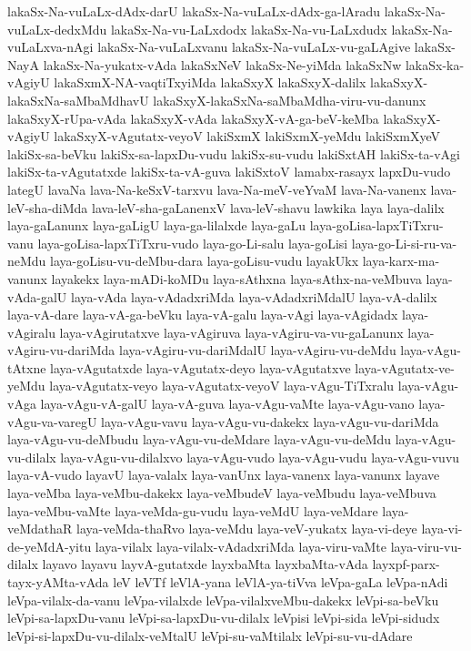 {lakaSx-Na-vuLaLx-dAdx-darU
lakaSx-Na-vuLaLx-dAdx-ga-lAradu
lakaSx-Na-vuLaLx-dedxMdu
lakaSx-Na-vu-LaLxdodx
lakaSx-Na-vu-LaLxdudx
lakaSx-Na-vuLaLxva-nAgi
lakaSx-Na-vuLaLxvanu
lakaSx-Na-vuLaLx-vu-gaLAgive
lakaSx-NayA
lakaSx-Na-yukatx-vAda
lakaSxNeV
lakaSx-Ne-yiMda
lakaSxNw
lakaSx-ka-vAgiyU
lakaSxmX-NA-vaqtiTxyiMda
lakaSxyX
lakaSxyX-dalilx
lakaSxyX-lakaSxNa-saMbaMdhavU
lakaSxyX-lakaSxNa-saMbaMdha-viru-vu-danunx
lakaSxyX-rUpa-vAda
lakaSxyX-vAda
lakaSxyX-vA-ga-beV-keMba
lakaSxyX-vAgiyU
lakaSxyX-vAgutatx-veyoV
lakiSxmX
lakiSxmX-yeMdu
lakiSxmXyeV
lakiSx-sa-beVku
lakiSx-sa-lapxDu-vudu
lakiSx-su-vudu
lakiSxtAH
lakiSx-ta-vAgi
lakiSx-ta-vAgutatxde
lakiSx-ta-vA-guva
lakiSxtoV
lamabx-rasayx
lapxDu-vudo
lategU
lavaNa
lava-Na-keSxV-tarxvu
lava-Na-meV-veYvaM
lava-Na-vanenx
lava-leV-sha-diMda
lava-leV-sha-gaLanenxV
lava-leV-shavu
lawkika
laya
laya-dalilx
laya-gaLanunx
laya-gaLigU
laya-ga-lilalxde
laya-gaLu
laya-goLisa-lapxTiTxru-vanu
laya-goLisa-lapxTiTxru-vudo
laya-go-Li-salu
laya-goLisi
laya-go-Li-si-ru-va-neMdu
laya-goLisu-vu-deMbu-dara
laya-goLisu-vudu
layakUkx
laya-karx-ma-vanunx
layakekx
laya-mADi-koMDu
laya-sAthxna
laya-sAthx-na-veMbuva
laya-vAda-galU
laya-vAda
laya-vAdadxriMda
laya-vAdadxriMdalU
laya-vA-dalilx
laya-vA-dare
laya-vA-ga-beVku
laya-vA-galu
laya-vAgi
laya-vAgidadx
laya-vAgiralu
laya-vAgirutatxve
laya-vAgiruva
laya-vAgiru-va-vu-gaLanunx
laya-vAgiru-vu-dariMda
laya-vAgiru-vu-dariMdalU
laya-vAgiru-vu-deMdu
laya-vAgu-tAtxne
laya-vAgutatxde
laya-vAgutatx-deyo
laya-vAgutatxve
laya-vAgutatx-ve-yeMdu
laya-vAgutatx-veyo
laya-vAgutatx-veyoV
laya-vAgu-TiTxralu
laya-vAgu-vAga
laya-vAgu-vA-galU
laya-vA-guva
laya-vAgu-vaMte
laya-vAgu-vano
laya-vAgu-va-varegU
laya-vAgu-vavu
laya-vAgu-vu-dakekx
laya-vAgu-vu-dariMda
laya-vAgu-vu-deMbudu
laya-vAgu-vu-deMdare
laya-vAgu-vu-deMdu
laya-vAgu-vu-dilalx
laya-vAgu-vu-dilalxvo
laya-vAgu-vudo
laya-vAgu-vudu
laya-vAgu-vuvu
laya-vA-vudo
layavU
laya-valalx
laya-vanUnx
laya-vanenx
laya-vanunx
layave
laya-veMba
laya-veMbu-dakekx
laya-veMbudeV
laya-veMbudu
laya-veMbuva
laya-veMbu-vaMte
laya-veMda-gu-vudu
laya-veMdU
laya-veMdare
laya-veMdathaR
laya-veMda-thaRvo
laya-veMdu
laya-veV-yukatx
laya-vi-deye
laya-vi-de-yeMdA-yitu
laya-vilalx
laya-vilalx-vAdadxriMda
laya-viru-vaMte
laya-viru-vu-dilalx
layavo
layavu
layvA-gutatxde
layxbaMta
layxbaMta-vAda
layxpf-parx-tayx-yAMta-vAda
leV
leVTf
leVlA-yana
leVlA-ya-tiVva
leVpa-gaLa
leVpa-nAdi
leVpa-vilalx-da-vanu
leVpa-vilalxde
leVpa-vilalxveMbu-dakekx
leVpi-sa-beVku
leVpi-sa-lapxDu-vanu
leVpi-sa-lapxDu-vu-dilalx
leVpisi
leVpi-sida
leVpi-sidudx
leVpi-si-lapxDu-vu-dilalx-veMtalU
leVpi-su-vaMtilalx
leVpi-su-vu-dAdare
}
